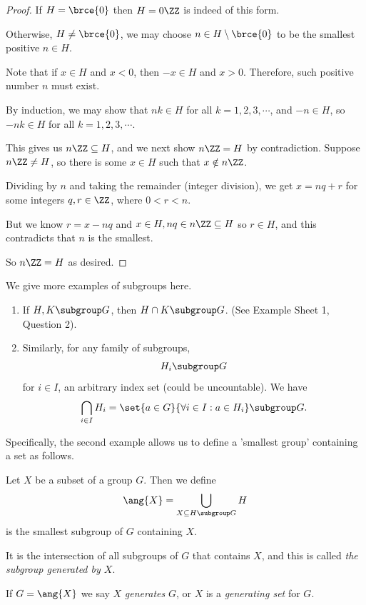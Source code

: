 \begin{proof}
    If \(H = \brce{0}\) then \(H = 0\ZZ\) is indeed of this form.

    Otherwise, \(H \neq \brce{0}\), we may choose \(n \in H \setminus \brce{0}\) to be the smallest positive \(n \in H\).

    Note that if \(x \in H\) and \(x < 0\), then \(-x \in H\) and \(x > 0\). Therefore, such positive number \(n\) must exist.

    By induction, we may show that \(nk \in H\) for all \(k = 1, 2, 3, \cdots\), and \(-n \in H\), so \(-nk \in H\) for all \(k = 1, 2, 3, \cdots\).

    This gives us \(n\ZZ \subseteq H\), and we next show \(n\ZZ = H\) by contradiction. Suppose \(n \ZZ \neq H\), so there is some \(x \in H\) such that \(x \notin n\ZZ\).

    Dividing by \(n\) and taking the remainder (integer division), we get \(x = nq + r\) for some integers \(q, r \in \ZZ\), where \(0 < r < n\).

    But we know \(r = x - nq\) and \(x \in H, nq \in n\ZZ \subseteq H\) so \(r \in H\), and this contradicts that \(n\) is the smallest.

    So \(n\ZZ = H\) as desired.
\end{proof}

We give more examples of subgroups here.

\begin{examples}
    \begin{enumerate}
        \item If \(H, K \subgroup G\), then \(H \cap K \subgroup G\). (See Example Sheet 1, Question 2).
        \item Similarly, for any family of subgroups,
        \[
            H_i \subgroup G
        \]
        for \(i \in I\), an arbitrary index set (could be uncountable). We have
        \[
            \bigcap_{i \in I} H_i = \set{a \in G}{\forall i \in I: a \in H_i} \subgroup G.
        \]
    \end{enumerate}
\end{examples}

Specifically, the second example allows us to define a 'smallest group' containing a set as follows.

\begin{definition}
    \label{def:generating-set}%
    Let \(X\) be a subset of a group \(G\). Then we define
    \[
        \ang{X} = \bigcup_{X \subseteq H \subgroup G} H
    \]
    is the smallest subgroup of \(G\) containing \(X\).

    It is the intersection of all subgroups of \(G\) that contains \(X\), and this is called \emph{the subgroup generated by \(X\)}.

    If \(G = \ang{X}\) we say \(X\) \emph{generates} \(G\), or \(X\) is a \emph{generating set} for \(G\).
\end{definition}

